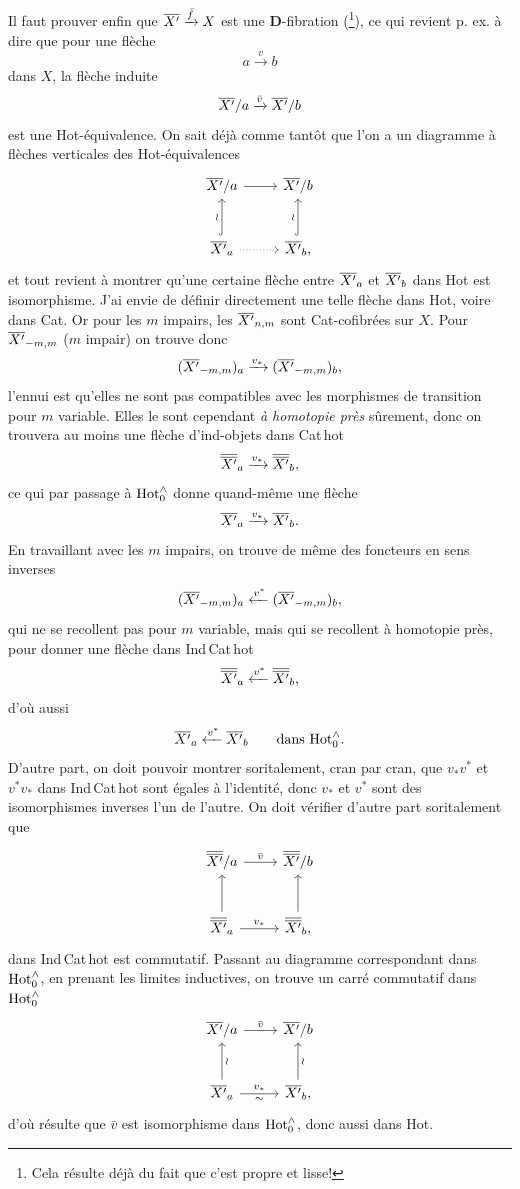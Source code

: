 Il faut prouver enfin que $\overline{X'} \xrightarrow{\bar f} X$ est une \textbf{D}-fibration (\footnote[39]{Cela résulte déjà du fait que c'est propre et lisse!}), ce qui revient p. ex. à dire que pour une flèche
\[
a \xrightarrow{v} b
\]
dans $X$, la flèche induite
\[
\overline{X'}/a \xrightarrow{\bar v} \overline{X'}/b
\]
est une Hot-équivalence. On sait déjà comme tantôt que l'on a un diagramme à flèches verticales des Hot-équivalences
\[
\begin{tikzcd}[row sep=large]
\Xb/a \arrow[r] & \Xb/b \\
\Xb_a \arrow[u, hook, "\wr"] \arrow[r, dotted] & \Xb_b, \arrow[u, hook, "\wr"]
\end{tikzcd}
\]
et tout revient à montrer qu'une certaine flèche entre $\overline{X'}_a$ et $\overline{X'}_b$ dans Hot est isomorphisme. J'ai envie de définir directement une telle flèche dans Hot, voire dans Cat. Or pour les $m$ impairs, les $\overline{X'}_{n,m}$ sont Cat-cofibrées sur $X$. Pour $\overline{X'}_{-m,m}$ ($m$ impair) on trouve donc
\[
(\overline{X'}_{-m,m})_a \xrightarrow{v_*} (\overline{X'}_{-m,m})_b,
\]
l'ennui est qu'elles ne sont pas compatibles avec les morphismes de transition pour $m$ variable. Elles le sont cependant \textit{à homotopie près} sûrement, donc on trouvera au moins une flèche d'ind-objets dans Cat\,hot
\[
\overline{\overline{X'}}_a \xrightarrow{v_*} \overline{\overline{X'}}_b,
\]
ce qui par passage à $\mathrm{Hot}^{\wedge}_{0}$ donne quand-même une flèche
\[
\overline{X'}_a \xrightarrow{v_*} \overline{X'}_b.
\]
En travaillant avec les $m$ impairs, on trouve de même des foncteurs en sens inverses %
\[
(\overline{X'}_{-m,m})_a \xleftarrow{v^*} (\overline{X'}_{-m,m})_b,
\]
qui ne se recollent pas pour $m$ variable, mais qui se recollent à homotopie près, pour donner une flèche dans Ind\,Cat\,hot
\[
\overline{\overline{X'}}_a \xleftarrow{v^*} \overline{\overline{X'}}_b,
\]
d'où aussi
\[
\overline{X'}_a \xleftarrow{v^*} \overline{X'}_b \qquad \text{dans } \mathrm{Hot}^{\wedge}_{0}.
\]
D'autre part, on doit pouvoir montrer soritalement,
cran par cran, que $v_*v^*$ et $v^*v_*$ dans Ind\,Cat\,hot sont égales à l'identité, donc $v_*$ et $v^*$ sont des isomorphismes inverses l'un de l'autre. On doit vérifier d'autre part soritalement que
\[
\begin{tikzcd}[row sep=large]
\Xbb/a \arrow[r, "\bar v"] & \Xbb/b \\
\Xbb_a \arrow[u] \arrow[r, "v_*"] & \Xbb_b, \arrow[u]
\end{tikzcd}
\]
dans Ind\,Cat\,hot est commutatif. Passant au diagramme correspondant dans $\mathrm{Hot}^{\wedge}_{0}$, en prenant les limites inductives, on trouve un carré commutatif dans $\mathrm{Hot}^{\wedge}_{0}$
\[
\begin{tikzcd}[row sep=large]
\Xb/a \arrow[r, "\bar v"] & \Xb/b \\
\Xb_a \arrow[u, "\wr"'] \arrow[r, "v_*", "\sim"'] & \Xb_b, \arrow[u, "\wr"']
\end{tikzcd}
\]
d'où résulte que $\bar v$ est isomorphisme dans $\mathrm{Hot}^{\wedge}_{0}$, donc aussi dans Hot.

